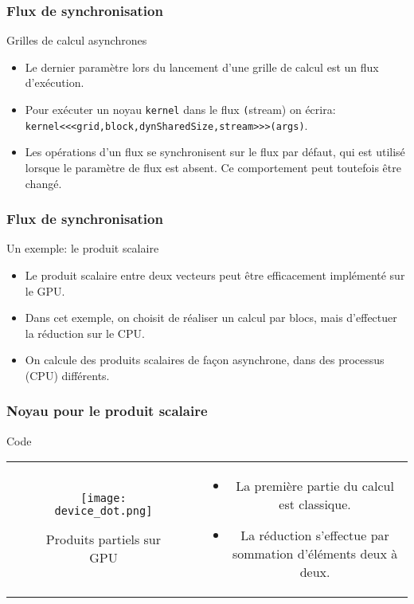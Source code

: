 \begin{frame}[fragile]
    \frametitle{Flux de synchronisation}
\begin{block}{Grilles de calcul asynchrones}
    \begin{itemize}
        \item<+-> Le dernier paramètre lors du lancement d'une grille de calcul est un flux d'exécution.
        \item<+-> Pour exécuter un noyau \texttt{kernel} dans le flux \texttt(stream) on écrira:
        \texttt{kernel<<<grid,block,dynSharedSize,stream>>>(args)}.
        \item<+-> Les opérations d'un flux se synchronisent sur le flux par défaut, qui est utilisé lorsque le paramètre de flux est absent. Ce comportement peut toutefois être changé.
    \end{itemize}
\end{block}
\end{frame}
\begin{frame}
    \frametitle{Flux de synchronisation}
\begin{block}{Un exemple: le produit scalaire}
    \begin{itemize}
        \item<+-> Le produit scalaire entre deux vecteurs peut être efficacement implémenté sur le GPU.
        \item<+-> Dans cet exemple, on choisit de réaliser un calcul par blocs, mais d'effectuer la réduction sur 
        le CPU.
        \item<+-> On calcule des produits scalaires de façon asynchrone, dans des processus (CPU) différents.
    \end{itemize}
\end{block}
\end{frame}
\begin{frame}
    \frametitle{Noyau pour le produit scalaire}
\begin{block}{Code}
   \begin{tabular}{cc}
        \begin{minipage}{0.45\textwidth}
 \begin{figure}[htbp]
    \centering
   \texttt{[image: device\_dot.png]}
    \caption{Produits partiels sur GPU}
    \label{fig:device_dot}
\end{figure}
        \end{minipage} & 
        \begin{minipage}{0.45\textwidth}
            \begin{itemize}
                \item<+-> La première partie du calcul est classique.
                \item<+-> La réduction s'effectue par sommation d'éléments deux à deux.
           \end{itemize}
        \end{minipage}
\end{tabular}
\end{block}
\end{frame}
